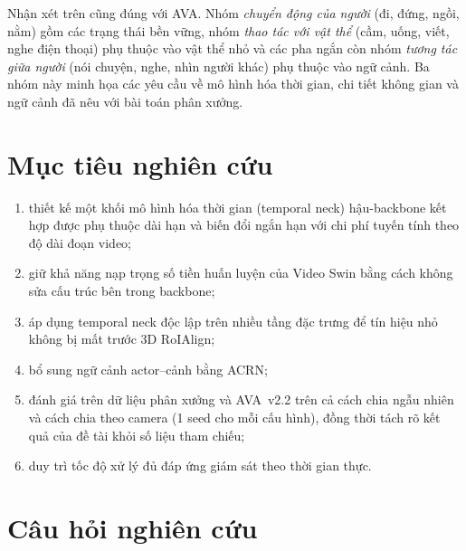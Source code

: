 Nhận xét trên cũng đúng với AVA. Nhóm \emph{chuyển động của người} (đi, đứng, ngồi, nằm) gồm các trạng thái bền vững, nhóm \emph{thao tác với vật thể} (cầm, uống, viết, nghe điện thoại) phụ thuộc vào vật thể nhỏ và các pha ngắn còn nhóm \emph{tương tác giữa người} (nói chuyện, nghe, nhìn người khác) phụ thuộc vào ngữ cảnh. Ba nhóm này minh họa các yêu cầu về mô hình hóa thời gian, chi tiết không gian và ngữ cảnh đã nêu với bài toán phân xưởng.

\section{Mục tiêu nghiên cứu}
\label{sec:objectives}

\begin{enumerate}[label=M\arabic*.,leftmargin=1.2cm]
  \item thiết kế một khối mô hình hóa thời gian (temporal neck) hậu-backbone kết hợp được phụ thuộc dài hạn và biến đổi ngắn hạn với chi phí tuyến tính theo độ dài đoạn video;
  \item giữ khả năng nạp trọng số tiền huấn luyện của Video Swin bằng cách không sửa cấu trúc bên trong backbone;
  \item áp dụng temporal neck độc lập trên nhiều tầng đặc trưng để tín hiệu nhỏ không bị mất trước 3D RoIAlign;
  \item bổ sung ngữ cảnh actor--cảnh bằng ACRN;
  \item đánh giá trên dữ liệu phân xưởng và AVA~v2.2 trên cả cách chia ngẫu nhiên và cách chia theo camera (1 seed cho mỗi cấu hình), đồng thời tách rõ kết quả của đề tài khỏi số liệu tham chiếu;
  \item duy trì tốc độ xử lý đủ đáp ứng giám sát theo thời gian thực.
\end{enumerate}

\section{Câu hỏi nghiên cứu}
\label{sec:rq}

